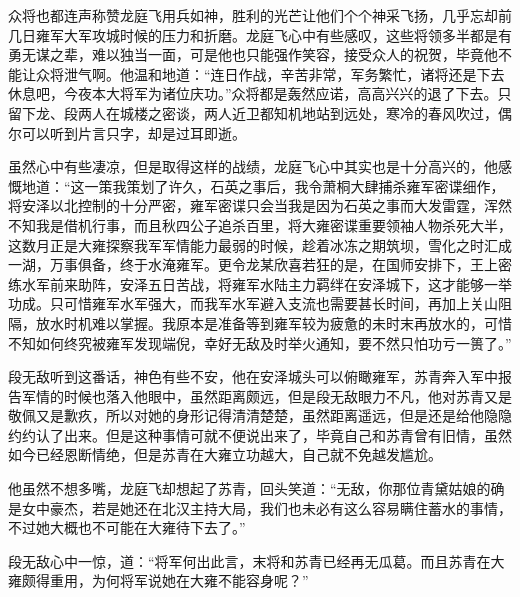众将也都连声称赞龙庭飞用兵如神，胜利的光芒让他们个个神采飞扬，几乎忘却前几日雍军大军攻城时候的压力和折磨。龙庭飞心中有些感叹，这些将领多半都是有勇无谋之辈，难以独当一面，可是他也只能强作笑容，接受众人的祝贺，毕竟他不能让众将泄气啊。他温和地道：“连日作战，辛苦非常，军务繁忙，诸将还是下去休息吧，今夜本大将军为诸位庆功。”众将都是轰然应诺，高高兴兴的退了下去。只留下龙、段两人在城楼之密谈，两人近卫都知机地站到远处，寒冷的春风吹过，偶尔可以听到片言只字，却是过耳即逝。

虽然心中有些凄凉，但是取得这样的战绩，龙庭飞心中其实也是十分高兴的，他感慨地道：“这一策我策划了许久，石英之事后，我令萧桐大肆捕杀雍军密谍细作，将安泽以北控制的十分严密，雍军密谍只会当我是因为石英之事而大发雷霆，浑然不知我是借机行事，而且秋四公子追杀百里，将大雍密谍重要领袖人物杀死大半，这数月正是大雍探察我军军情能力最弱的时候，趁着冰冻之期筑坝，雪化之时汇成一湖，万事俱备，终于水淹雍军。更令龙某欣喜若狂的是，在国师安排下，王上密练水军前来助阵，安泽五日苦战，将雍军水陆主力羁绊在安泽城下，这才能够一举功成。只可惜雍军水军强大，而我军水军避入支流也需要甚长时间，再加上关山阻隔，放水时机难以掌握。我原本是准备等到雍军较为疲惫的未时末再放水的，可惜不知如何终究被雍军发现端倪，幸好无敌及时举火通知，要不然只怕功亏一篑了。”

段无敌听到这番话，神色有些不安，他在安泽城头可以俯瞰雍军，苏青奔入军中报告军情的时候也落入他眼中，虽然距离颇远，但是段无敌眼力不凡，他对苏青又是敬佩又是歉疚，所以对她的身形记得清清楚楚，虽然距离遥远，但是还是给他隐隐约约认了出来。但是这种事情可就不便说出来了，毕竟自己和苏青曾有旧情，虽然如今已经恩断情绝，但是苏青在大雍立功越大，自己就不免越发尴尬。

他虽然不想多嘴，龙庭飞却想起了苏青，回头笑道：“无敌，你那位青黛姑娘的确是女中豪杰，若是她还在北汉主持大局，我们也未必有这么容易瞒住蓄水的事情，不过她大概也不可能在大雍待下去了。”

段无敌心中一惊，道：“将军何出此言，末将和苏青已经再无瓜葛。而且苏青在大雍颇得重用，为何将军说她在大雍不能容身呢？”

